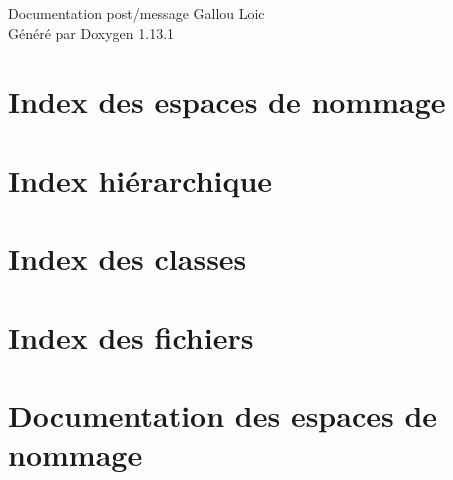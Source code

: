 \documentclass[twoside]{book}
\newcommand{\+}{\discretionary{\mbox{\scriptsize$\hookleftarrow$}}{}{}}
\newcommand{\clearemptydoublepage}{%
    \newpage{\pagestyle{empty}\cleardoublepage}%
  }
\begin{document}
  \raggedbottom
    \hypersetup{pageanchor=false,
                bookmarksnumbered=true,
                pdfencoding=unicode
               }
  \begin{titlepage}
  \vspace*{7cm}
  \begin{center}%
  {\Large Documentation post/message Gallou Loic}\\
  \vspace*{1cm}
  {\large Généré par Doxygen 1.13.1}\\
  \end{center}
  \end{titlepage}
  \clearemptydoublepage
  \tableofcontents
  \clearemptydoublepage
  \hypersetup{pageanchor=true}
\chapter{Index des espaces de nommage}

\chapter{Index hiérarchique}

\chapter{Index des classes}

\chapter{Index des fichiers}

\chapter{Documentation des espaces de nommage}









\end{document}
